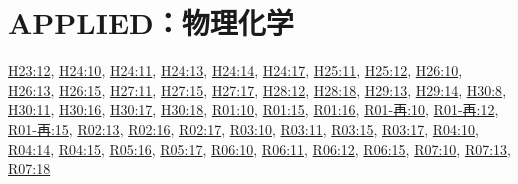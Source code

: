 \section{APPLIED：物理化学}
\hyperref[q:h23-reg-applied-12]{H23:12}, \hyperref[q:h24-reg-applied-10]{H24:10}, \hyperref[q:h24-reg-applied-11]{H24:11}, \hyperref[q:h24-reg-applied-13]{H24:13}, \hyperref[q:h24-reg-applied-14]{H24:14}, \hyperref[q:h24-reg-applied-17]{H24:17}, \hyperref[q:h25-reg-applied-11]{H25:11}, \hyperref[q:h25-reg-applied-12]{H25:12}, \hyperref[q:h26-reg-applied-10]{H26:10}, \hyperref[q:h26-reg-applied-13]{H26:13}, \hyperref[q:h26-reg-applied-15]{H26:15}, \hyperref[q:h27-reg-applied-11]{H27:11}, \hyperref[q:h27-reg-applied-15]{H27:15}, \hyperref[q:h27-reg-applied-17]{H27:17}, \hyperref[q:h28-reg-applied-12]{H28:12}, \hyperref[q:h28-reg-applied-18]{H28:18}, \hyperref[q:h29-reg-applied-13]{H29:13}, \hyperref[q:h29-reg-applied-14]{H29:14}, \hyperref[q:h30-reg-applied-08]{H30:8}, \hyperref[q:h30-reg-applied-11]{H30:11}, \hyperref[q:h30-reg-applied-16]{H30:16}, \hyperref[q:h30-reg-applied-17]{H30:17}, \hyperref[q:h30-reg-applied-18]{H30:18}, \hyperref[q:r01-reg-applied-10]{R01:10}, \hyperref[q:r01-reg-applied-15]{R01:15}, \hyperref[q:r01-reg-applied-16]{R01:16}, \hyperref[q:r01-ret-applied-10]{R01-再:10}, \hyperref[q:r01-ret-applied-12]{R01-再:12}, \hyperref[q:r01-ret-applied-15]{R01-再:15}, \hyperref[q:r02-reg-applied-13]{R02:13}, \hyperref[q:r02-reg-applied-16]{R02:16}, \hyperref[q:r02-reg-applied-17]{R02:17}, \hyperref[q:r03-reg-applied-10]{R03:10}, \hyperref[q:r03-reg-applied-11]{R03:11}, \hyperref[q:r03-reg-applied-15]{R03:15}, \hyperref[q:r03-reg-applied-17]{R03:17}, \hyperref[q:r04-reg-applied-10]{R04:10}, \hyperref[q:r04-reg-applied-14]{R04:14}, \hyperref[q:r04-reg-applied-15]{R04:15}, \hyperref[q:r05-reg-applied-16]{R05:16}, \hyperref[q:r05-reg-applied-17]{R05:17}, \hyperref[q:r06-reg-applied-10]{R06:10}, \hyperref[q:r06-reg-applied-11]{R06:11}, \hyperref[q:r06-reg-applied-12]{R06:12}, \hyperref[q:r06-reg-applied-15]{R06:15}, \hyperref[q:r07-reg-applied-10]{R07:10}, \hyperref[q:r07-reg-applied-13]{R07:13}, \hyperref[q:r07-reg-applied-18]{R07:18}
